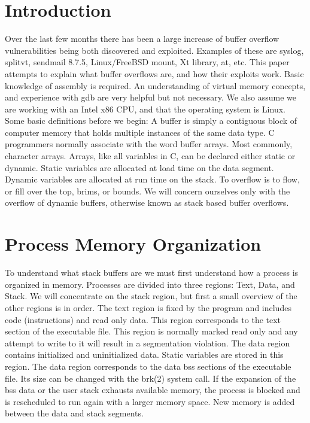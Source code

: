 \documentclass[10pt]{article}
\begin{document}
\begin{CJK}{UTF8}{bsmi}
\section{Introduction}
Over the last few months there has been a large increase of buffer overflow vulnerabilities being both discovered and exploited. Examples of these are syslog, splitvt, sendmail 8.7.5, Linux/FreeBSD mount, Xt library, at, etc. This paper attempts to explain what buffer overflows are, and how their exploits work. Basic  knowledge of assembly is required. An understanding of virtual memory concepts, and experience with gdb are  very helpful but not necessary. We also assume we are working with an Intel x86 CPU, and that the operating  system is Linux. Some basic definitions before we begin: A buffer is simply a contiguous block of computer  memory that holds multiple instances of  the same data type. C programmers normally associate with the word  buffer arrays. Most commonly, character arrays. Arrays, like all variables in C,  can be declared either static or  dynamic. Static variables are allocated at load time on the data segment. Dynamic variables are allocated at  run  time on the stack. To overflow is to flow, or fill over the top, brims, or bounds.
We will concern ourselves only  with the overflow of dynamic buffers,
otherwise known as stack based buffer overflows.

\section{Process Memory Organization}

To understand what stack buffers are we must first understand how a process is organized in memory. Processes 
are divided into three regions: Text, Data, and Stack. We will concentrate on the stack region, but first a small 
overview of the other regions is in order. The text region is fixed by the program and includes code 
(instructions) and read only data. This region corresponds to the text section of the executable file. This region is normally marked read only and any attempt to write to it will result in a segmentation violation. The data 
region contains initialized and uninitialized data. Static variables are stored in this region. The data region 
corresponds to the data bss sections of the executable file. Its size can be changed with the brk(2) system call. If 
the expansion of the bss data or the user stack exhausts available memory, the process is blocked and is 
rescheduled to run again with a larger memory space. New memory is added between the data and stack 
segments.


\end{CJK}
\end{document}
